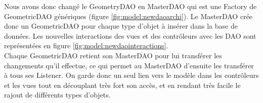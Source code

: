		Nous avons donc changé le GeometryDAO en MasterDAO qui est une Factory de 
		GeometricDAO génériques (figure \ref{fig:model:newdaoarchi}). Le MasterDAO 
		crée donc un GeometricDAO pour chaque type d'objet à insérer dans 
		la base de données. Les nouvelles interactions des vues et des contrôleurs 
		avec les DAO sont représentées en figure \ref{fig:model:newdaointeractions}.\\

		Chaque GeometricDAO retient son MasterDAO pour lui transférer les changements
		qu'il effectue, ce qui permet au MasterDAO d'ensuite les transférer à tous 
		ses Listener. On garde donc un seul lien vers le modèle
		dans les contrôleurs et les vues tout en découplant très fort son accès,
		et en rendant très facile le rajout de différents types d'objets.\\

